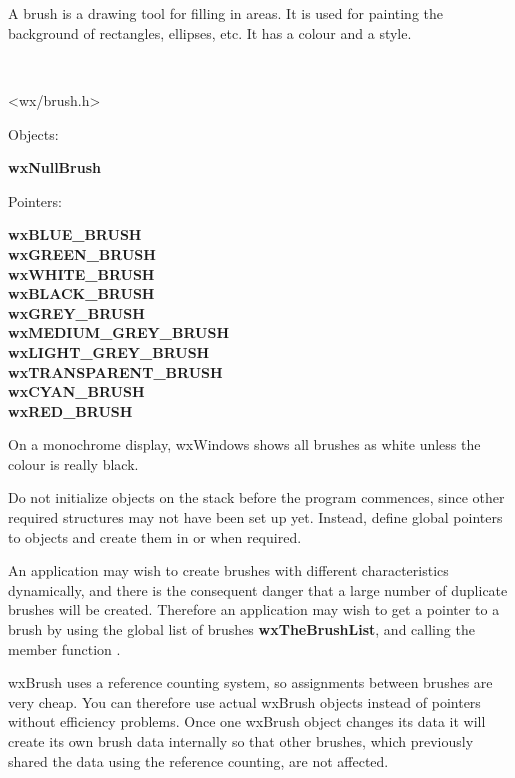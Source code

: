 \section{}\label{wxbrush}

A brush is a drawing tool for filling in areas. It is used for painting
the background of rectangles, ellipses, etc. It has a colour and a
style.


\\


<wx/brush.h>


Objects:

{\bf wxNullBrush}

Pointers:

{\bf wxBLUE\_BRUSH\\
wxGREEN\_BRUSH\\
wxWHITE\_BRUSH\\
wxBLACK\_BRUSH\\
wxGREY\_BRUSH\\
wxMEDIUM\_GREY\_BRUSH\\
wxLIGHT\_GREY\_BRUSH\\
wxTRANSPARENT\_BRUSH\\
wxCYAN\_BRUSH\\
wxRED\_BRUSH}


On a monochrome display, wxWindows shows
all brushes as white unless the colour is really black.

Do not initialize objects on the stack before the program commences,
since other required structures may not have been set up yet. Instead,
define global pointers to objects and create them in  or
when required.

An application may wish to create brushes with different
characteristics dynamically, and there is the consequent danger that a
large number of duplicate brushes will be created. Therefore an
application may wish to get a pointer to a brush by using the global
list of brushes {\bf wxTheBrushList}, and calling the member function
.

wxBrush uses a reference counting system, so assignments between brushes are very
cheap. You can therefore use actual wxBrush objects instead of pointers without
efficiency problems. Once one wxBrush object changes its data it will create its
own brush data internally so that other brushes, which previously shared the
data using the reference counting, are not affected.

